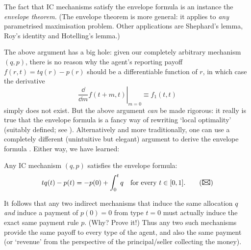 The fact that IC mechanisms satisfy the envelope formula is an instance the \emph{envelope theorem.}
(The envelope theorem is more general: it applies to \emph{any} parametrised maximisation problem. Other applications are Shephard's lemma, Roy's identity and Hotelling's lemma.)


The above argument has a big hole: given our completely arbitrary mechanism $(q,p)$, there is no reason why the agent's reporting payoff $f(r,t) = t q(r) - p(r)$ should be a differentiable function of $r$, in which case the derivative
%
\begin{equation*}
	\left. \frac{\dd}{\dd m} f( t+m, t ) \right|_{m=0}
	\equiv f_1(t,t)
\end{equation*}
%
simply does not exist.
But the above argument \emph{can} be made rigorous: it really is true that the envelope formula is a fancy way of rewriting `local optimality' (suitably defined; see \textcite{Sinander2022}).
Alternatively and more traditionally,
one can use a completely different (unintuitive but elegant) argument to derive the envelope formula \parencite{MilgromSegal2002}.
Either way, we have learned:

\begin{namedthm}
	\label{proposition:ic_env}
	Any IC mechanism $(q,p)$ satisfies the envelope formula:
	\begin{equation*}
		t q(t) - p(t) = - p(0) + \int_0^t q
		\quad \text{for every $t \in [0,1]$.}
		\tag{{\Large\Letter}}
	\end{equation*}
\end{namedthm}


\begin{remark}
	\label{remark:rev_equivalence}
	It follows that any two indirect mechanisms
	that induce the same allocation $q$
	\emph{and} induce a payment of $p(0)=0$ from type $t=0$
	must actually induce the exact same payment rule $p$.
	(Why? Prove it!)
	Thus any two such mechanisms provide the same payoff to every type of the agent,
	and also the same payment (or `revenue' from the perspective of the principal/seller collecting the money).
\end{remark}


